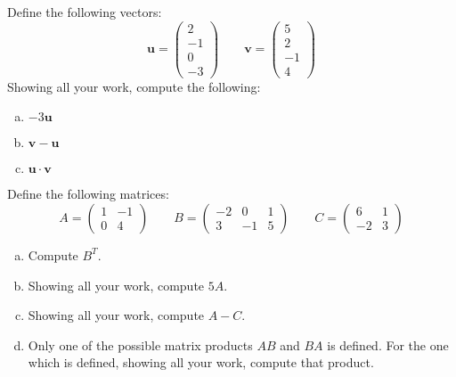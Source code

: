 \documentclass[12pt,letterpaper]{exam}
\begin{document}
\examtitle
{} 
\scores
\bottomline
\newpage

\begin{questions}

\newpage
\question[10] Define the following vectors:
	\[
	\mathbf{u}= \begin{pmatrix} 2 \\ -1 \\ 0 \\ -3 \end{pmatrix} \qquad
	\mathbf{v}= \begin{pmatrix} 5 \\ 2 \\ -1 \\ 4 \end{pmatrix}
	\]
Showing all your work, compute the following:
	\begin{enumerate}[(a)]
	\item $-3 \mathbf{u}$
	\item $\mathbf{v} - \mathbf{u}$
	\item $\mathbf{u} \cdot \mathbf{v}$
	\end{enumerate}



\newpage
\question[10] Define the following matrices:
	\[
	A= \begin{pmatrix} 1 & -1 \\ 0 & 4 \end{pmatrix} \qquad
	B= \begin{pmatrix} -2 & 0 & 1 \\ 3 & -1 & 5 \end{pmatrix} \qquad
	C= \begin{pmatrix} 6 & 1 \\ -2 & 3 \end{pmatrix}
	\]

\begin{enumerate}[(a)]
\item Compute $B^T$.
\item Showing all your work, compute $5A$.
\item Showing all your work, compute $A - C$.
\item Only one of the possible matrix products $AB$ and $BA$ is defined. For the one which is defined, showing all your work, compute that product. 
\end{enumerate}




\end{questions}
\end{document}
